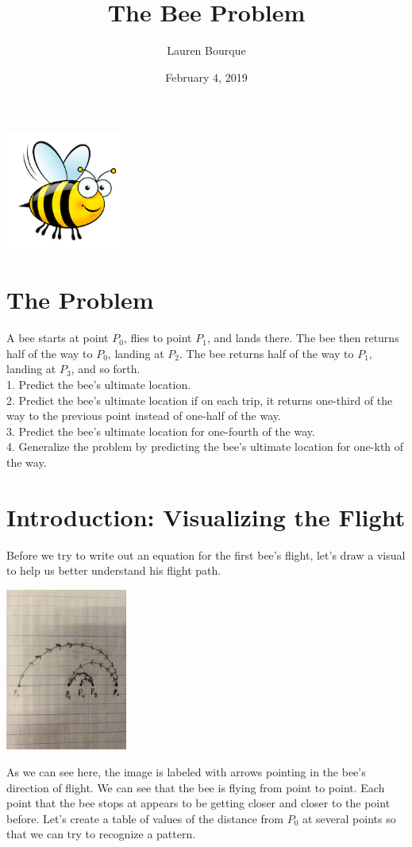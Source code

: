 \documentclass[a4paper,openright, 14pt]{article}
\title{The Bee Problem}
\author{Lauren Bourque}
\date{February 4, 2019}
\begin{document}
\maketitle
\begin{center}
    \includegraphics[width=4cm, height=4cm]{Images/bee.png}
\end{center}
\section*{The Problem}
A bee starts at point $P_0$, flies to point $P_1$, and lands there. The bee then returns half of the way to $P_0$, landing at $P_2$. The bee returns half of the way to $P_1$, landing at $P_3$, and so forth.\\
1. Predict the bee's ultimate location.\\
2. Predict the bee's ultimate location if on each trip, it returns one-third of the way to the previous point instead of one-half of the way.\\
3. Predict the bee's ultimate location for one-fourth of the way.\\
4. Generalize the problem by predicting the bee's ultimate location for one-kth of the way.
\section*{Introduction: Visualizing the Flight}
Before we try to write out an equation for the first bee's flight, let's draw a visual to help us better understand his flight path.
\begin{center}
    \includegraphics[angle=270, width=4cm ]{Images/path.jpg}
\end{center}
As we can see here, the image is labeled with arrows pointing in the bee's direction of flight. We can see that the bee is flying from point to point. Each point that the bee stops at appears to be getting closer and closer to the point before. Let's create a table of values of the distance from $P_0$ at several points so that we can try to recognize a pattern.
\end{document}
